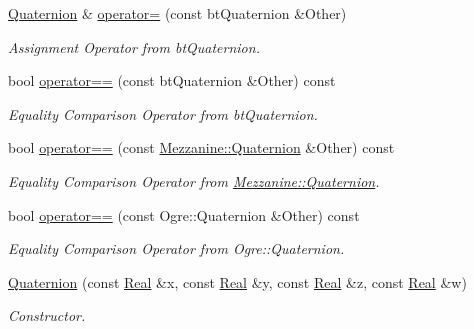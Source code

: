 \begin{DoxyCompactItemize}
\hyperlink{classMezzanine_1_1Quaternion}{Quaternion} \& \hyperlink{classMezzanine_1_1Quaternion_a9161be1bd30cc8ed85abd51ab25df13b}{operator=} (const btQuaternion \&Other)
\begin{DoxyCompactList}\small\item\em Assignment Operator from btQuaternion. \item\end{DoxyCompactList}\item 
bool \hyperlink{classMezzanine_1_1Quaternion_a215b5281dd8e04e78e6b83e0b22f82e5}{operator==} (const btQuaternion \&Other) const 
\begin{DoxyCompactList}\small\item\em Equality Comparison Operator from btQuaternion. \item\end{DoxyCompactList}\item 
bool \hyperlink{classMezzanine_1_1Quaternion_a3bc8e9a4943bcd9b52a467a455e0d30d}{operator==} (const \hyperlink{classMezzanine_1_1Quaternion}{Mezzanine::Quaternion} \&Other) const 
\begin{DoxyCompactList}\small\item\em Equality Comparison Operator from \hyperlink{classMezzanine_1_1Quaternion}{Mezzanine::Quaternion}. \item\end{DoxyCompactList}\item 
bool \hyperlink{classMezzanine_1_1Quaternion_a3e59a2f24d3a0eb69e3088a78fedb6a2}{operator==} (const Ogre::Quaternion \&Other) const 
\begin{DoxyCompactList}\small\item\em Equality Comparison Operator from Ogre::Quaternion. \item\end{DoxyCompactList}\item 
\hyperlink{classMezzanine_1_1Quaternion_af05fe746b775d6969cf256d1ff66506d}{Quaternion} (const \hyperlink{namespaceMezzanine_a726731b1a7df72bf3583e4a97282c6f6}{Real} \&x, const \hyperlink{namespaceMezzanine_a726731b1a7df72bf3583e4a97282c6f6}{Real} \&y, const \hyperlink{namespaceMezzanine_a726731b1a7df72bf3583e4a97282c6f6}{Real} \&z, const \hyperlink{namespaceMezzanine_a726731b1a7df72bf3583e4a97282c6f6}{Real} \&w)
\begin{DoxyCompactList}\small\item\em Constructor. \item\end{DoxyCompactList}\item 

\end{DoxyCompactItemize}
